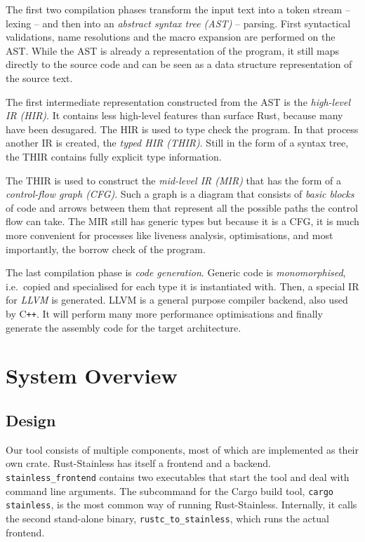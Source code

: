The first two compilation phases transform the input text into a token stream --
lexing -- and then into an \emph{abstract syntax tree (AST)} -- parsing. First
syntactical validations, name resolutions and the macro expansion are performed
on the AST. While the AST is already a representation of the program, it still
maps directly to the source code and can be seen as a data structure
representation of the source text.

The first intermediate representation constructed from the AST is the
\emph{high-level IR (HIR)}. It contains less high-level features than surface
Rust, because many have been desugared. The HIR is used to type check the
program. In that process another IR is created, the \emph{typed HIR (THIR)}.
Still in the form of a syntax tree, the THIR contains fully explicit type
information.

The THIR is used to construct the \emph{mid-level IR (MIR)} that has the form of
a \emph{control-flow graph (CFG)}. Such a graph is a diagram that consists of
\emph{basic blocks} of code and arrows between them that represent all the
possible paths the control flow can take. The MIR still has generic types but
because it is a CFG, it is much more convenient for processes like liveness
analysis, optimisations, and most importantly, the borrow check of the program.

The last compilation phase is \emph{code generation}. Generic code is
\emph{monomorphised}, i.e.~copied and specialised for each type it is
instantiated with. Then, a special IR for \emph{LLVM} \cite{llvm} is generated.
LLVM is a general purpose compiler backend, also used by C\texttt{++}. It will
perform many more performance optimisations and finally generate the assembly
code for the target architecture.

\section{System Overview}

\subsection{Design}

Our tool consists of multiple components, most of which are implemented as their
own crate. Rust-Stainless has itself a frontend and a backend.
\lstinline!stainless_frontend! contains two executables that start the tool and
deal with command line arguments. The subcommand for the Cargo build tool,
\passthrough{\lstinline!cargo stainless!}, is the most common way of running
Rust-Stainless. Internally, it calls the second stand-alone binary,
\lstinline!rustc_to_stainless!, which runs the actual frontend.

